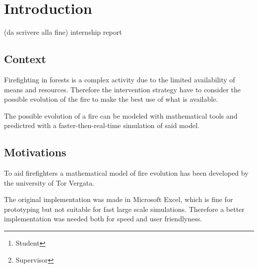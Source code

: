 \documentclass[draft]{article}
\title{\mytitle}
\date{2021}
\author{Diego Bellani\thanks{Student}\and Enrico Tronci\thanks{Supervisor}}
\begin{document}
\begin{titlepage}
	\maketitle

	\begin{abstract}
	(Max one page, da scrivere alla fine)
	\end{abstract}

	\tableofcontents
	\iffalse
	\listoffigures
	\listoftables
	\fi
\end{titlepage}


\section{Introduction}\label{sec:intro}

(da scrivere alla fine) internship report

\subsection{Context}\label{sec:context}

Firefighting in forests is a complex activity due to the limited availability of
means and resources. Therefore the intervention strategy have to consider the
possible evolution of the fire to make the best use of what is available.

The possible evolution of a fire can be modeled with mathematical tools and
predictred with a faster-then-real-time simulation of said model.

\subsection{Motivations}\label{sec:motivations}

\iffalse
Describe what is missing and instead would be useful to have\dots Non ne ho la
minima idea. Also Modelica did not made the cut.
\fi

To aid firefighters a mathematical model of fire evolution has been developed by
the university of Tor Vergata.

The original implementation was made in Microsoft
Excel\textsuperscript{\textregistered}, which is fine for prototyping but not
suitable for fast large scale simulations. Therefore a better implementation was
needed both for speed and user friendlyness.
\end{document}

